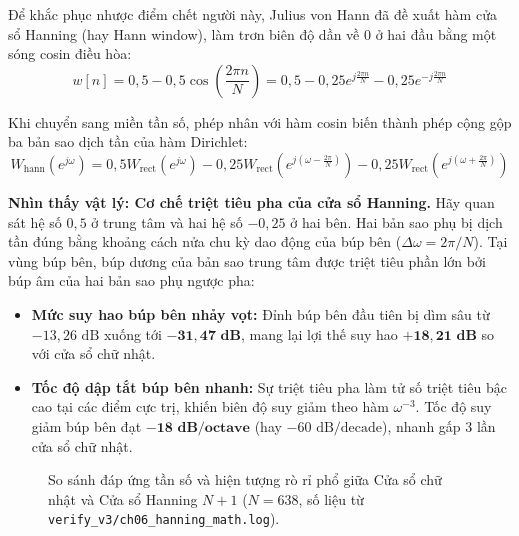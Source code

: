 Để khắc phục nhược điểm chết người này, Julius von Hann đã đề xuất hàm cửa sổ Hanning (hay Hann window), làm trơn biên độ dần về $0$ ở hai đầu bằng một sóng cosin điều hòa:
\begin{equation}
w[n] = 0{,}5 - 0{,}5 \cos\left( \frac{2\pi n}{N} \right) = 0{,}5 - 0{,}25 e^{j\frac{2\pi n}{N}} - 0{,}25 e^{-j\frac{2\pi n}{N}}
\end{equation}

Khi chuyển sang miền tần số, phép nhân với hàm cosin biến thành phép cộng gộp ba bản sao dịch tần của hàm Dirichlet:
\begin{equation}
W_{\text{hann}}(e^{j\omega}) = 0{,}5 W_{\text{rect}}(e^{j\omega}) - 0{,}25 W_{\text{rect}}\left(e^{j\left(\omega - \frac{2\pi}{N}\right)}\right) - 0{,}25 W_{\text{rect}}\left(e^{j\left(\omega + \frac{2\pi}{N}\right)}\right)
\end{equation}

\begin{physicalinsight}
\textbf{Nhìn thấy vật lý: Cơ chế triệt tiêu pha của cửa sổ Hanning.}
Hãy quan sát hệ số $0{,}5$ ở trung tâm và hai hệ số $-0{,}25$ ở hai bên. Hai bản sao phụ bị dịch tần đúng bằng khoảng cách nửa chu kỳ dao động của búp bên ($\Delta\omega = 2\pi/N$). Tại vùng búp bên, búp dương của bản sao trung tâm được triệt tiêu phần lớn bởi búp âm của hai bản sao phụ ngược pha:
\begin{itemize}[leftmargin=1.5em, itemsep=2pt]
    \item \textbf{Mức suy hao búp bên nhảy vọt:} Đỉnh búp bên đầu tiên bị dìm sâu từ $-13{,}26\text{ dB}$ xuống tới $\mathbf{-31{,}47\text{ dB}}$, mang lại lợi thế suy hao $\mathbf{+18{,}21\text{ dB}}$ so với cửa sổ chữ nhật.
    \item \textbf{Tốc độ dập tắt búp bên nhanh:} Sự triệt tiêu pha làm tử số triệt tiêu bậc cao tại các điểm cực trị, khiến biên độ suy giảm theo hàm $\omega^{-3}$. Tốc độ suy giảm búp bên đạt $\mathbf{-18\text{ dB/octave}}$ (hay $-60\text{ dB/decade}$), nhanh gấp 3 lần cửa sổ chữ nhật.
\end{itemize}
\end{physicalinsight}

\begin{figure}[H]
\centering
\resizebox{0.92\textwidth}{!}{}
\caption{So sánh đáp ứng tần số và hiện tượng rò rỉ phổ giữa Cửa sổ chữ nhật và Cửa sổ Hanning $N+1$ ($N = 638$, số liệu từ \texttt{verify\_v3/ch06\_hanning\_math.log}).}
\label{fig:ch06_leakage}
\end{figure}

